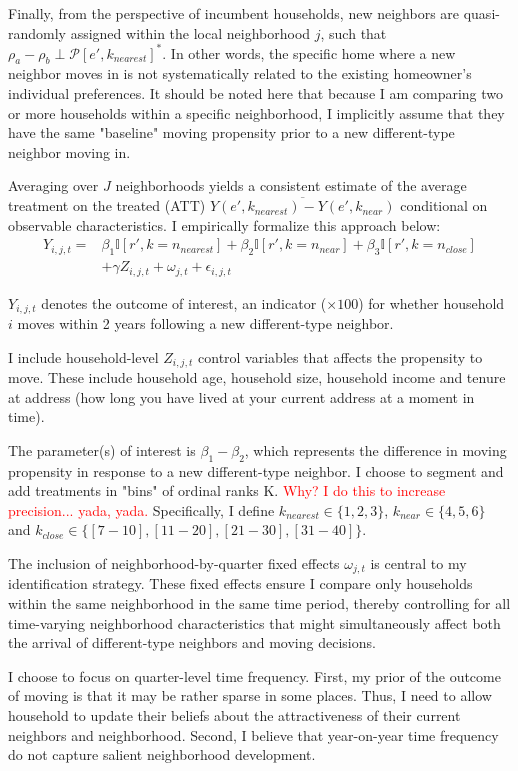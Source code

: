 \documentclass[../main.tex]{subfiles}
\begin{document}
Finally, from the perspective of incumbent households, new neighbors are quasi-randomly assigned within the local neighborhood $j$, such that $\rho_a - \rho_b \perp \mathcal{P}[e', k_{nearest}]^*$. In other words, the specific home where a new neighbor moves in is not systematically related to the existing homeowner's individual preferences. It should be noted here that because I am comparing two or more households within a specific neighborhood, I implicitly assume that they have the same "baseline" moving propensity prior to a new different-type neighbor moving in. 

Averaging over $J$ neighborhoods yields a consistent estimate of the average treatment on the treated (ATT) $\overline{Y(e', k_{nearest}) - Y(e', k_{near})}$ conditional on observable characteristics. I empirically formalize this approach below:
\begin{equation}
\begin{split}
    Y_{i, j, t} = &\beta_1 \mathbb{I}[r', k=n_{nearest}] + \beta_2 \mathbb{I}[r', k = n_{near}] + \beta_3 \mathbb{I}[r', k = n_{close}] \\
    & + \gamma Z_{i, j, t} + \omega_{j, t} + \epsilon_{i, j, t}
\label{eq:main_eq_schelling_behavior}
\end{split}
\end{equation}

$Y_{i, j, t}$ denotes the outcome of interest, an indicator ($\times100$) for whether household $i$ moves within 2 years following a new different-type neighbor. 

I include household-level $Z_{i,j,t}$ control variables that affects the propensity to move. These include household age, household size, household income and tenure at address (how long you have lived at your current address at a moment in time). 

The parameter(s) of interest is $\beta_1 - \beta_2$, which represents the difference in moving propensity in response to a new different-type neighbor. I choose to segment and add treatments in "bins" of ordinal ranks K. \textcolor{red}{Why? I do this to increase precision... yada, yada.} Specifically, I define $k_{nearest} \in \{1, 2, 3\}$, $k_{near} \in \{4, 5, 6\}$ and $k_{close} \in \{[7-10], [11-20], [21-30], [31-40]\}$.

The inclusion of neighborhood-by-quarter fixed effects $\omega_{j,t}$ is central to my identification strategy. These fixed effects ensure I compare only households within the same neighborhood in the same time period, thereby controlling for all time-varying neighborhood characteristics that might simultaneously affect both the arrival of different-type neighbors and moving decisions.

I choose to focus on quarter-level time frequency. First, my prior of the outcome of moving is that it may be rather sparse in some places. Thus, I need to allow household to update their beliefs about the attractiveness of their current neighbors and neighborhood. Second, I believe that year-on-year time frequency do not capture salient neighborhood development.  
\end{document}
